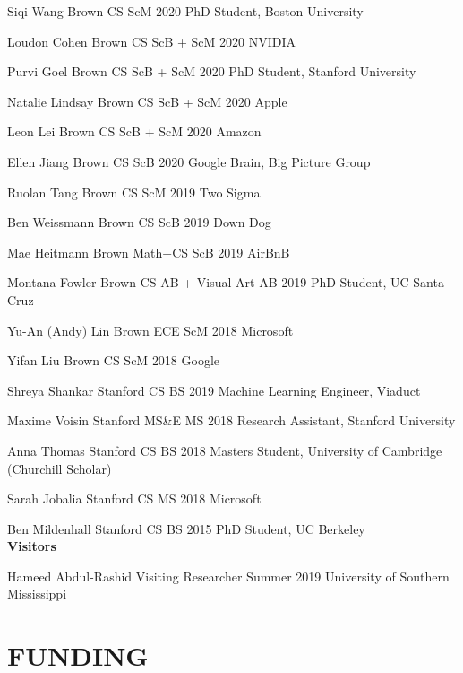 \documentclass[line,margin]{res}
\begin{document}
\begin{resume}
\alumni
{Siqi Wang}
{Brown CS ScM}
{2020}
{PhD Student, Boston University}

\alumni
{Loudon Cohen}
{Brown CS ScB + ScM}
{2020}
{NVIDIA}

\alumni
{Purvi Goel}
{Brown CS ScB + ScM}
{2020}
{PhD Student, Stanford University}

\alumni
{Natalie Lindsay}
{Brown CS ScB + ScM}
{2020}
{Apple}

\alumni
{Leon Lei}
{Brown CS ScB + ScM}
{2020}
{Amazon}

\alumni
{Ellen Jiang}
{Brown CS ScB}
{2020}
{Google Brain, Big Picture Group}


\alumni
{Ruolan Tang}
{Brown CS ScM}
{2019}
{Two Sigma}

\alumni
{Ben Weissmann}
{Brown CS ScB}
{2019}
{Down Dog}

\alumni
{Mae Heitmann}
{Brown Math+CS ScB}
{2019}
{AirBnB}

\alumni
{Montana Fowler}
{Brown CS AB + Visual Art AB}
{2019}
{PhD Student, UC Santa Cruz}

\alumni
{Yu-An (Andy) Lin}
{Brown ECE ScM}
{2018}
{Microsoft}

\alumni
{Yifan Liu}
{Brown CS ScM}
{2018}
{Google}

\alumni
{Shreya Shankar}
{Stanford CS BS}
{2019}
{Machine Learning Engineer, Viaduct}

\alumni
{Maxime Voisin}
{Stanford MS\&E MS}
{2018}
{Research Assistant, Stanford University}

\alumni
{Anna Thomas}
{Stanford CS BS}
{2018}
{Masters Student, University of Cambridge (Churchill Scholar)}

\alumni
{Sarah Jobalia}
{Stanford CS MS}
{2018}
{Microsoft}

\alumni
{Ben Mildenhall}
{Stanford CS BS}
{2015}
{PhD Student, UC Berkeley}
\\


\textbf{Visitors}

\visitor
{Hameed Abdul-Rashid}
{Visiting Researcher}
{Summer 2019}
{University of Southern Mississippi}


\section{FUNDING}

\newcommand{\funding}[5] {
	\textbf{#1} \hfill #5\\
	#2 \\
	#3. #4
}


\end{resume}
\end{document}
